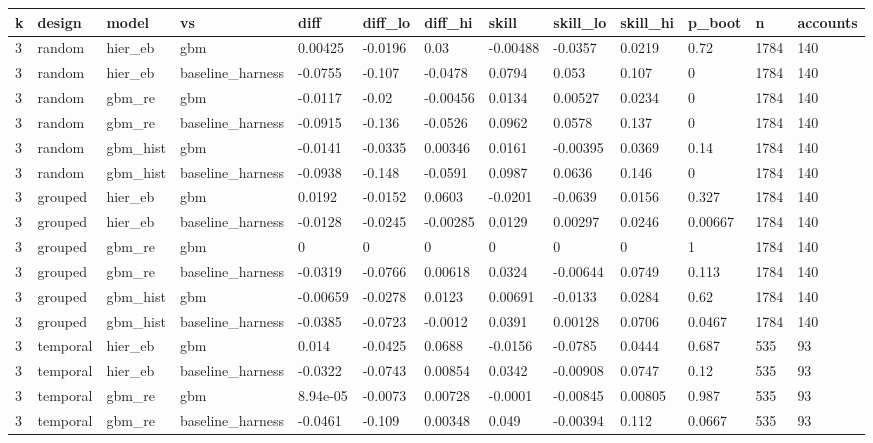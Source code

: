 \begin{tabular}{lllllllllllll}
\toprule
k & design & model & vs & diff & diff\_lo & diff\_hi & skill & skill\_lo & skill\_hi & p\_boot & n & accounts \\
\midrule
3 & random & hier\_eb & gbm & 0.00425 & -0.0196 & 0.03 & -0.00488 & -0.0357 & 0.0219 & 0.72 & 1784 & 140 \\
3 & random & hier\_eb & baseline\_harness & -0.0755 & -0.107 & -0.0478 & 0.0794 & 0.053 & 0.107 & 0 & 1784 & 140 \\
3 & random & gbm\_re & gbm & -0.0117 & -0.02 & -0.00456 & 0.0134 & 0.00527 & 0.0234 & 0 & 1784 & 140 \\
3 & random & gbm\_re & baseline\_harness & -0.0915 & -0.136 & -0.0526 & 0.0962 & 0.0578 & 0.137 & 0 & 1784 & 140 \\
3 & random & gbm\_hist & gbm & -0.0141 & -0.0335 & 0.00346 & 0.0161 & -0.00395 & 0.0369 & 0.14 & 1784 & 140 \\
3 & random & gbm\_hist & baseline\_harness & -0.0938 & -0.148 & -0.0591 & 0.0987 & 0.0636 & 0.146 & 0 & 1784 & 140 \\
3 & grouped & hier\_eb & gbm & 0.0192 & -0.0152 & 0.0603 & -0.0201 & -0.0639 & 0.0156 & 0.327 & 1784 & 140 \\
3 & grouped & hier\_eb & baseline\_harness & -0.0128 & -0.0245 & -0.00285 & 0.0129 & 0.00297 & 0.0246 & 0.00667 & 1784 & 140 \\
3 & grouped & gbm\_re & gbm & 0 & 0 & 0 & 0 & 0 & 0 & 1 & 1784 & 140 \\
3 & grouped & gbm\_re & baseline\_harness & -0.0319 & -0.0766 & 0.00618 & 0.0324 & -0.00644 & 0.0749 & 0.113 & 1784 & 140 \\
3 & grouped & gbm\_hist & gbm & -0.00659 & -0.0278 & 0.0123 & 0.00691 & -0.0133 & 0.0284 & 0.62 & 1784 & 140 \\
3 & grouped & gbm\_hist & baseline\_harness & -0.0385 & -0.0723 & -0.0012 & 0.0391 & 0.00128 & 0.0706 & 0.0467 & 1784 & 140 \\
3 & temporal & hier\_eb & gbm & 0.014 & -0.0425 & 0.0688 & -0.0156 & -0.0785 & 0.0444 & 0.687 & 535 & 93 \\
3 & temporal & hier\_eb & baseline\_harness & -0.0322 & -0.0743 & 0.00854 & 0.0342 & -0.00908 & 0.0747 & 0.12 & 535 & 93 \\
3 & temporal & gbm\_re & gbm & 8.94e-05 & -0.0073 & 0.00728 & -0.0001 & -0.00845 & 0.00805 & 0.987 & 535 & 93 \\
3 & temporal & gbm\_re & baseline\_harness & -0.0461 & -0.109 & 0.00348 & 0.049 & -0.00394 & 0.112 & 0.0667 & 535 & 93 \\

\end{tabular}
